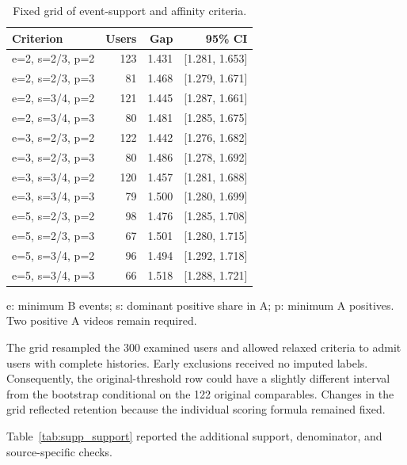 \documentclass[11pt,a4paper]{article}
\begin{document}
\begin{table}[H]\centering\small
\caption{Fixed grid of event-support and affinity criteria.}
\label{tab:supp_grid}
\setlength{\tabcolsep}{4pt}
\begin{tabular}{lrrr}\toprule
Criterion & Users & Gap & 95\% CI\\\midrule
e=2, s=2/3, p=2 & 123 & 1.431 & [1.281, 1.653]\\
e=2, s=2/3, p=3 & 81 & 1.468 & [1.279, 1.671]\\
e=2, s=3/4, p=2 & 121 & 1.445 & [1.287, 1.661]\\
e=2, s=3/4, p=3 & 80 & 1.481 & [1.285, 1.675]\\
e=3, s=2/3, p=2 & 122 & 1.442 & [1.276, 1.682]\\
e=3, s=2/3, p=3 & 80 & 1.486 & [1.278, 1.692]\\
e=3, s=3/4, p=2 & 120 & 1.457 & [1.281, 1.688]\\
e=3, s=3/4, p=3 & 79 & 1.500 & [1.280, 1.699]\\
e=5, s=2/3, p=2 & 98 & 1.476 & [1.285, 1.708]\\
e=5, s=2/3, p=3 & 67 & 1.501 & [1.280, 1.715]\\
e=5, s=3/4, p=2 & 96 & 1.494 & [1.292, 1.718]\\
e=5, s=3/4, p=3 & 66 & 1.518 & [1.288, 1.721]\\
\bottomrule\end{tabular}
\par\smallskip\footnotesize e: minimum B events; s: dominant positive share in A; p: minimum A positives. Two positive A videos remain required.
\end{table}

The grid resampled the 300 examined users and allowed relaxed criteria to admit users with complete histories. Early exclusions received no imputed labels. Consequently, the original-threshold row could have a slightly different interval from the bootstrap conditional on the 122 original comparables. Changes in the grid reflected retention because the individual scoring formula remained fixed.

Table~\ref{tab:supp_support} reported the additional support, denominator, and source-specific checks.
\end{document}
